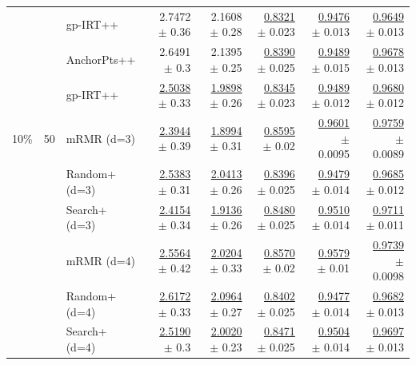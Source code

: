 \begin{longtable}{llp{}rrrrr}
 &  & gp-IRT++ & 2.7472 {\scriptsize $\pm$ 0.36} & 2.1608 {\scriptsize $\pm$ 0.28} & \underline{0.8321} {\scriptsize $\pm$ 0.023} & \underline{0.9476} {\scriptsize $\pm$ 0.013} & \underline{0.9649} {\scriptsize $\pm$ 0.013} \\
 &  & AnchorPts++ & 2.6491 {\scriptsize $\pm$ 0.3} & 2.1395 {\scriptsize $\pm$ 0.25} & \underline{0.8390} {\scriptsize $\pm$ 0.025} & \underline{0.9489} {\scriptsize $\pm$ 0.015} & \underline{0.9678} {\scriptsize $\pm$ 0.013} \\
 &  & gp-IRT++ & \underline{2.5038} {\scriptsize $\pm$ 0.33} & \underline{1.9898} {\scriptsize $\pm$ 0.26} & \underline{0.8345} {\scriptsize $\pm$ 0.023} & \underline{0.9489} {\scriptsize $\pm$ 0.012} & \underline{0.9680} {\scriptsize $\pm$ 0.012} \\
\midrule
10\% & 50 & mRMR (d=3) & \underline{2.3944} {\scriptsize $\pm$ 0.39} & \underline{1.8994} {\scriptsize $\pm$ 0.31} & \underline{0.8595} {\scriptsize $\pm$ 0.02} & \underline{0.9601} {\scriptsize $\pm$ 0.0095} & \underline{0.9759} {\scriptsize $\pm$ 0.0089} \\
 &  & Random+ (d=3) & \underline{2.5383} {\scriptsize $\pm$ 0.31} & \underline{2.0413} {\scriptsize $\pm$ 0.26} & \underline{0.8396} {\scriptsize $\pm$ 0.025} & \underline{0.9479} {\scriptsize $\pm$ 0.014} & \underline{0.9685} {\scriptsize $\pm$ 0.012} \\
 &  & Search+ (d=3) & \underline{2.4154} {\scriptsize $\pm$ 0.34} & \underline{1.9136} {\scriptsize $\pm$ 0.26} & \underline{0.8480} {\scriptsize $\pm$ 0.025} & \underline{0.9510} {\scriptsize $\pm$ 0.014} & \underline{0.9711} {\scriptsize $\pm$ 0.011} \\
 &  & mRMR (d=4) & \underline{2.5564} {\scriptsize $\pm$ 0.42} & \underline{2.0204} {\scriptsize $\pm$ 0.33} & \underline{0.8570} {\scriptsize $\pm$ 0.02} & \underline{0.9579} {\scriptsize $\pm$ 0.01} & \underline{0.9739} {\scriptsize $\pm$ 0.0098} \\
 &  & Random+ (d=4) & \underline{2.6172} {\scriptsize $\pm$ 0.33} & \underline{2.0964} {\scriptsize $\pm$ 0.27} & \underline{0.8402} {\scriptsize $\pm$ 0.025} & \underline{0.9477} {\scriptsize $\pm$ 0.014} & \underline{0.9682} {\scriptsize $\pm$ 0.013} \\
 &  & Search+ (d=4) & \underline{2.5190} {\scriptsize $\pm$ 0.3} & \underline{2.0020} {\scriptsize $\pm$ 0.23} & \underline{0.8471} {\scriptsize $\pm$ 0.025} & \underline{0.9504} {\scriptsize $\pm$ 0.014} & \underline{0.9697} {\scriptsize $\pm$ 0.013} \\

\end{longtable}
